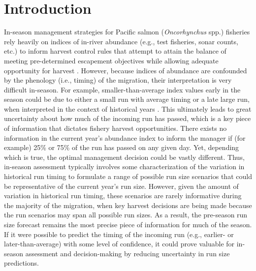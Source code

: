 \documentclass[12pt,]{book}
\theoremstyle{definition}
\theoremstyle{definition}
\theoremstyle{definition}
\theoremstyle{remark}
\begin{document}
\section{Introduction}\label{introduction}

\noindent
In-season management strategies for Pacific salmon (\emph{Oncorhynchus}
spp.) fisheries rely heavily on indices of in-river abundance (e.g.,
test fisheries, sonar counts, etc.) to inform harvest control rules that
attempt to attain the balance of meeting pre-determined escapement
objectives while allowing adequate opportunity for harvest
\citep{catalano-jones-2014}. However, because indices of abundance are
confounded by the phenology (i.e., timing) of the migration, their
interpretation is very difficult in-season. For example,
smaller-than-average index values early in the season could be due to
either a small run with average timing or a late large run, when
interpreted in the context of historical years
\citep{adkison-cunningham-2015}. This ultimately leads to great
uncertainty about how much of the incoming run has passed, which is a
key piece of information that dictates fishery harvest opportunities.
There exists no information in the current year's abundance index to
inform the manager if (for example) 25\% or 75\% of the run has passed
on any given day. Yet, depending which is true, the optimal management
decision could be vastly different. Thus, in-season assessment typically
involves some characterization of the variation in historical run timing
to formulate a range of possible run size scenarios that could be
representative of the current year's run size. However, given the amount
of variation in historical run timing, these scenarios are rarely
informative during the majority of the migration, when key harvest
decisions are being made because the run scenarios may span all possible
run sizes. As a result, the pre-season run size forecast remains the
most precise piece of information for much of the season. If it were
possible to predict the timing of the incoming run (e.g., earlier- or
later-than-average) with some level of confidence, it could prove
valuable for in-season assessment and decision-making by reducing
uncertainty in run size predictions.
\end{document}
